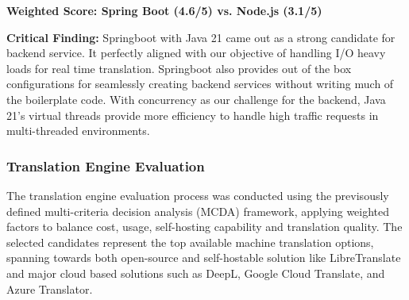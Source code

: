 \begin{table}[H]
\centering
\caption{Application Framework Comparison}
\end{table}

\textbf{Weighted Score: Spring Boot (4.6/5) vs. Node.js (3.1/5)}

\textbf{Critical Finding:} Springboot with Java 21 came out as a strong candidate for backend service. It perfectly aligned with our objective of handling I/O heavy loads for real time translation. Springboot also provides out of the box configurations for seamlessly creating backend services without writing much of the boilerplate code. With concurrency as our challenge for the backend, Java 21's virtual threads provide more efficiency to handle high traffic requests in multi-threaded environments.

\subsubsection{Translation Engine Evaluation}

The translation engine evaluation process was conducted using the previsously defined multi-criteria decision analysis (MCDA) framework, applying weighted factors to balance cost, usage, self-hosting capability and translation quality. The selected candidates represent the top available machine translation options, spanning towards both open-source and self-hostable solution like LibreTranslate and major cloud based solutions such as DeepL, Google Cloud Translate, and Azure Translator.

